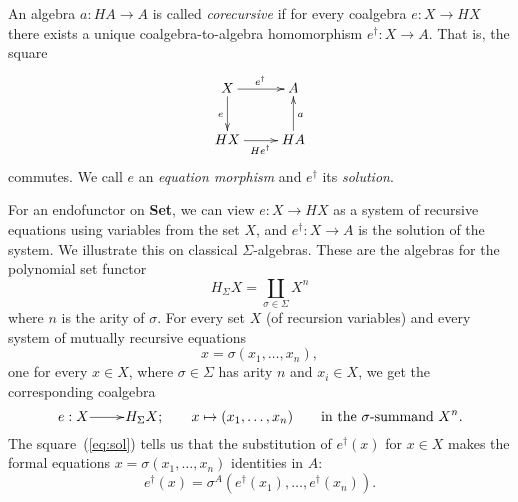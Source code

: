 \documentclass{LMCS}
\theoremstyle{plain}
\theoremstyle{definition}
\numberwithin{equation}{section}
\begin{document}
\begin{defi}\label{def of cor.alg}
An algebra $a:HA\rightarrow A$ is called {\it corecursive} if for every coalgebra $e:X\rightarrow HX$ there exists a unique coalgebra-to-algebra homomorphism $e^\dagger:X\rightarrow A$. That is, the square
\begin{equation}\label{eq:sol}
  \vcenter{
    \xymatrix{
      X\ar[r]^{e^\dagger}\ar[d]_{e}&A\\
      HX\ar[r]_{He^\dagger}&HA\ar[u]_{a}
    }
  }
\end{equation}
commutes. We call $e$ an {\it equation morphism} and $e^\dagger$ its {\it solution}.
\end{defi}
\begin{rem}
 For an endofunctor on {\bf Set}, we can view $e:X\rightarrow HX$ as a system of recursive equations using variables from the set $X$, and $e^{\dagger}:X\rightarrow A$ is the solution of the system. We illustrate this on classical $\Sigma$-algebras. These are the algebras for the polynomial set functor
$$H_\Sigma X=\coprod_{\sigma\in \Sigma} X^n$$
where $n$ is the arity of $\sigma$. For every set $X$ (of recursion variables) and every system of mutually recursive equations
$$x=\sigma(x_1,\ldots,x_n),$$
one for every $x\in X$, where $\sigma\in \Sigma$ has arity $n$ and $x_i\in X$, we get the corresponding coalgebra
$$
\xymatrix@1{
  e:X\ar[r] & H_{\Sigma}X;
}
\qquad 
x\mapsto(x_1,\ldots,x_n)
\qquad \textrm{in the $\sigma$-summand $X^n$.}
$$
The square~(\ref{eq:sol}) tells us that the substitution of $e^\dagger(x)$ for $x\in X$ makes the formal equations $x=\sigma(x_1,\ldots,x_n)$ identities in $A$:
$$e^\dagger (x)=\sigma^A(e^\dagger(x_1),\ldots,e^\dagger(x_n)).$$
\end{rem}
\end{document}
